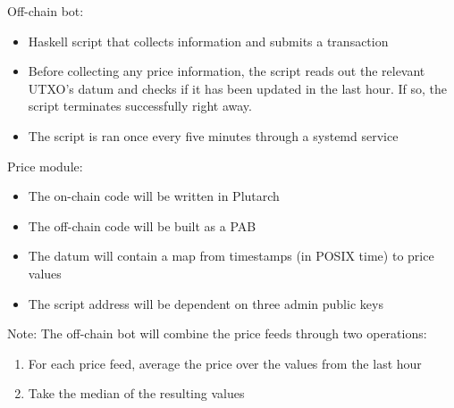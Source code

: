 \documentclass{article} %
\begin{document}
Off-chain bot:
\begin{itemize}
  \item Haskell script that collects information and submits a transaction
  \item Before collecting any price information, the script reads out the
    relevant UTXO's datum and checks if it has been updated in the last hour. If
    so, the script terminates successfully right away.
  \item The script is ran once every five minutes through a systemd service
\end{itemize}

Price module:
\begin{itemize}
  \item The on-chain code will be written in Plutarch
  \item The off-chain code will be built as a PAB
  \item The datum will contain a map from timestamps (in POSIX time) to price
    values
  \item The script address will be dependent on three admin public keys
\end{itemize}

Note: The off-chain bot will combine the price feeds through two operations:
\begin{enumerate}
  \item For each price feed, average the price over the values from the last
    hour
  \item Take the median of the resulting values
\end{enumerate}
\end{document}
